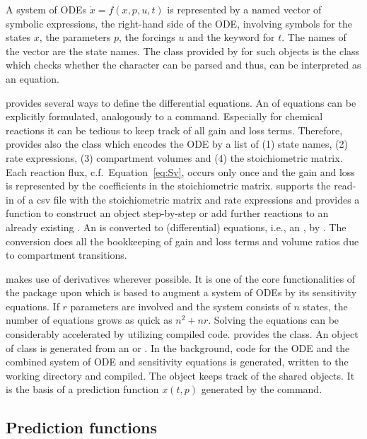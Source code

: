 \documentclass[article]{jss}
\begin{document}
A system of ODEs $\dot x = f(x, p, u, t)$ is represented by a named  vector of symbolic expressions, the right-hand side of the ODE, involving symbols for the states $x$, the parameters $p$, the forcings $u$ and the keyword  for $t$. The names of the vector are the state names. The class provided by  for such objects is the  class which checks whether the character can be parsed and thus, can be interpreted as an equation.

 provides several ways to define the differential equations. An  of equations can be explicitly formulated, analogously to a  command. Especially for chemical reactions it can be tedious to keep track of all gain and loss terms. Therefore,  provides also the  class which encodes the ODE by a list of (1) state names, (2) rate expressions, (3) compartment volumes and (4) the stoichiometric matrix. Each reaction flux, c.f.~Equation~\ref{eq:Sv}, occurs only once and the gain and loss is represented by the coefficients in the stoichiometric matrix.  supports the read-in of a csv file with the stoichiometric matrix and rate expressions and provides a function  to construct an  object step-by-step or add further reactions to an already existing . An  is converted to (differential) equations, i.e., an , by . The conversion does all the bookkeeping of gain and loss terms and volume ratios due to compartment transitions.

 makes use of derivatives wherever possible. It is one of the core functionalities of the  package \citep{cOde} upon which  is based to augment a system of ODEs by its sensitivity equations. If $r$ parameters are involved and the system consists of $n$ states, the number of equations grows as quick as $n^2 + nr$. Solving the equations can be considerably accelerated by utilizing compiled code.  provides the  class. An object of class  is generated from an  or . In the background,  code for the ODE and the combined system of ODE and sensitivity equations is generated, written to the working directory and compiled. The  object keeps track of the shared objects. It is the basis of a prediction function $x(t, p)$ generated by the  command.

\subsection{Prediction functions}
\end{document}
